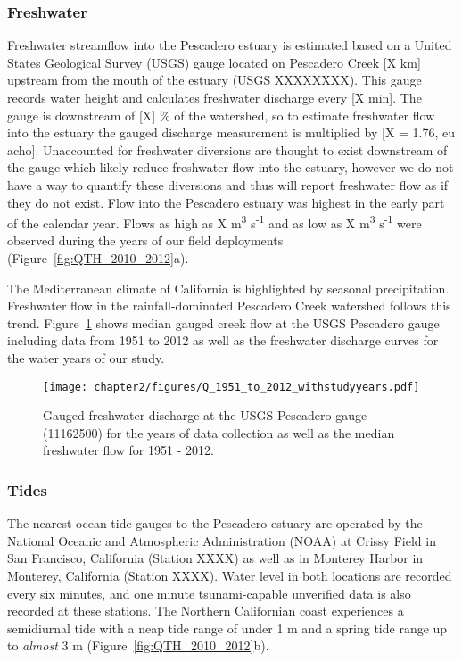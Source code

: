 \subsubsection{Freshwater}
Freshwater streamflow into the Pescadero estuary is
estimated based on a United States Geological Survey (USGS) gauge
located on Pescadero Creek [X km] upstream from the mouth of the estuary
(USGS XXXXXXXX). This gauge records water height and calculates
freshwater discharge every [X min]. The gauge is downstream of [X] \% of
the watershed, so to estimate freshwater flow into the estuary the
gauged discharge measurement is multiplied by [X = 1.76, eu acho].
Unaccounted for freshwater diversions are thought to exist downstream of
the gauge which likely reduce freshwater flow into the estuary, however
we do not have a way to quantify these diversions and thus will report
freshwater flow as if they do not exist. Flow into the Pescadero estuary was highest in the early part of the calendar year. Flows as high as X m\textsuperscript{3} s\textsuperscript{-1} and as low as X m\textsuperscript{3} s\textsuperscript{-1} were observed during the years of our field deployments (Figure~\ref{fig:QTH_2010_2012}a).

The Mediterranean climate of California is highlighted by seasonal
precipitation. Freshwater flow in the rainfall-dominated Pescadero Creek watershed follows this trend. Figure~\ref{fig:Q_1951_2012} shows median gauged creek flow at the USGS Pescadero gauge including data from 1951 to 2012 as well as the freshwater discharge curves for the water years of our study. 


\begin{figure}
	\begin{center}
		\texttt{[image: chapter2/figures/Q\_1951\_to\_2012\_withstudyyears.pdf]} \caption{Gauged freshwater discharge at the USGS Pescadero gauge (11162500) for the years of data collection as well as the median freshwater flow for 1951 - 2012.}\label{fig:Q_1951_2012}
	\end{center}
\end{figure}


\subsubsection{Tides}
The nearest ocean tide gauges to the Pescadero estuary are
operated by the National Oceanic and Atmospheric Administration (NOAA)
at Crissy Field in San Francisco, California (Station XXXX) as well as
in Monterey Harbor in Monterey, California (Station XXXX). Water
level in both locations are recorded every six minutes, and one minute
tsunami-capable unverified data is also recorded at these stations. The Northern Californian coast experiences a semidiurnal tide with a neap tide range of under 1 m and a spring tide range up to \emph{almost} 3 m (Figure~\ref{fig:QTH_2010_2012}b).


